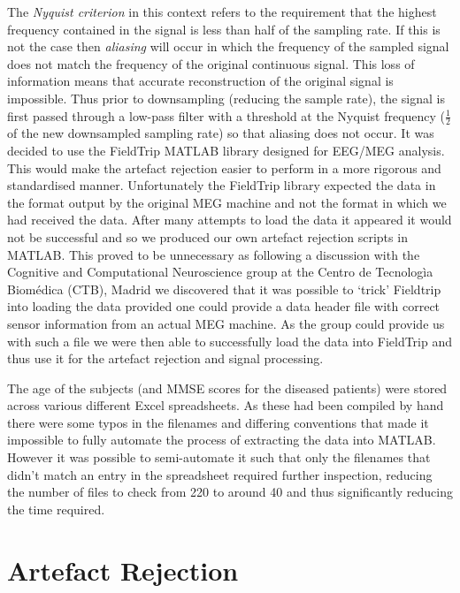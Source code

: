 The \textit{Nyquist criterion} in this context refers to the requirement that the highest frequency contained in the signal is less than half of the sampling rate. If this is not the case then \textit{aliasing} will occur in which the frequency of the sampled signal does not match the frequency of the original continuous signal. This loss of information means that accurate reconstruction of the original signal is impossible. Thus prior to downsampling (reducing the sample rate), the signal is first passed through a low-pass filter with a threshold at the Nyquist frequency ($\frac{1}{2}$ of the new downsampled sampling rate) so that aliasing does not occur. \cite{Smith1999} 
It was decided to use the FieldTrip MATLAB library\cite{Oostenveld2011} designed for EEG/MEG analysis. This would make the artefact rejection easier to perform in a more rigorous and standardised manner. Unfortunately the FieldTrip library expected the data in the format output by the original MEG machine and not the format in which we had received the data. After many attempts to load the data it appeared it would not be successful and so we produced our own artefact rejection scripts in MATLAB. This proved to be unnecessary as following a discussion with the Cognitive and Computational Neuroscience group at the Centro de Tecnolog\`{i}a Biom\'{e}dica (CTB), Madrid we discovered that it was possible to `trick' Fieldtrip into loading the data provided one could provide a data header file with correct sensor information from an actual MEG machine. As the group could provide us with such a file we were then able to successfully load the data into FieldTrip and thus use it for the artefact rejection and signal processing.

The age of the subjects (and MMSE scores for the diseased patients) were stored across various different Excel spreadsheets. As these had been compiled by hand there were some typos in the filenames and differing conventions that made it impossible to fully automate the process of extracting the data into MATLAB. However it was possible to semi-automate it such that only the filenames that didn't match an entry in the spreadsheet required further inspection, reducing the number of files to check from 220 to around 40 and thus significantly reducing the time required.

\section{Artefact Rejection}

